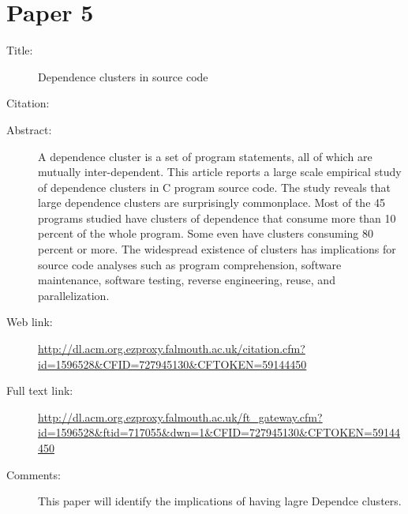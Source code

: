 \documentclass{scrartcl}
\begin{document}
\section*{Paper 5}
\begin{description}
\item[Title:]Dependence clusters in source code
\item[Citation:] \cite{harman2009dependence}
\item[Abstract:]A dependence cluster is a set of program statements, all of which are mutually inter-dependent. This article reports a large scale empirical study of dependence clusters in C program source code. The study reveals that large dependence clusters are surprisingly commonplace. Most of the 45 programs studied have clusters of dependence that consume more than 10 percent of the whole program. Some even have clusters consuming 80 percent or more. The widespread existence of clusters has implications for source code analyses such as program comprehension, software maintenance, software testing, reverse engineering, reuse, and parallelization.
\item[Web link:]\url {http://dl.acm.org.ezproxy.falmouth.ac.uk/citation.cfm?id=1596528&CFID=727945130&CFTOKEN=59144450}
\item[Full text link:] \url {http://dl.acm.org.ezproxy.falmouth.ac.uk/ft_gateway.cfm?id=1596528&ftid=717055&dwn=1&CFID=727945130&CFTOKEN=59144450}
\item[Comments:]This paper will identify the implications of having lagre Dependce clusters. 
\end{description}
\end{document}
